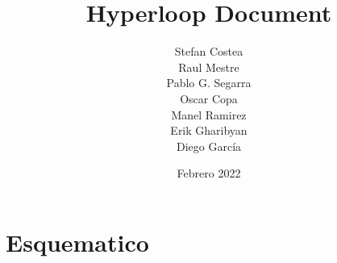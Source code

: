 \documentclass{article}
\title{Hyperloop Document}
\author{Stefan Costea \\ Raul Mestre \\ Pablo G. Segarra \\ Oscar Copa \\ Manel Ramirez \\ Erik Gharibyan\\
Diego García}
\date{Febrero 2022}
\begin{document}
\maketitle

\section{Esquematico}
\end{document}

